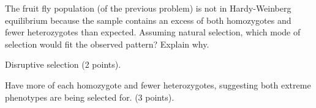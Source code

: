 \question[5]
The fruit fly population (of the previous problem) is not in Hardy-Weinberg equilibrium because the sample contains an excess of both homozygotes and fewer heterozygotes than expected. Assuming natural selection, which mode of selection would fit the observed pattern?  Explain why. 

\begin{solution}
Disruptive selection (2 points). 

Have more of each homozygote and fewer heterozygotes, suggesting both extreme phenotypes are being selected for. (3 points).

\end{solution}
